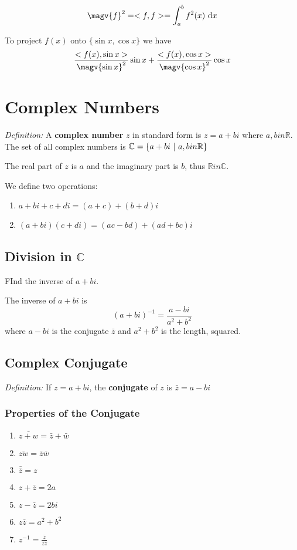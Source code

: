 \documentclass[12pt]{article}
\begin{document}
\[ \magv{f}^2 = <f,f> = \int_a^b f^2(x) \dd x \]

To project $f(x)$ onto $\{\sin x,\cos x\}$ we have \[ \frac{<f(x),\sin x>}{\magv{\sin x}^2}\sin x + \frac{<f(x),\cos x>}{\magv{\cos x}^2}\cos x \]

\section*{Complex Numbers}

\textit{Definition:} A {\bf complex number} $z$ in standard form is $z = a + bi$ where $a, b in \mathbb{R}$. The set of all complex numbers is $\mathbb{C} = \{a + bi \ |\  a, b in \mathbb{R}\}$

The real part of $z$ is $a$ and the imaginary part is $b$, thus $\mathbb{R} in \mathbb{C}$.

We define two operations:
\begin{enumerate}
\item $a + bi + c + di = (a + c) + (b + d)i$
\item $(a + bi)(c + di) = (ac - bd) + (ad + bc)i$
\end{enumerate}

\subsection*{Division in $\mathbb{C}$}
FInd the inverse of $a + bi$.

The inverse of $a + bi$ is \[ (a + bi)^{-1} = \frac{a - bi}{a^2 + b^2} \] where $a-bi$ is the conjugate $\bar{z}$ and $a^2 + b^2$ is the length, squared.

\subsection*{Complex Conjugate}
\textit{Definition:} If $z = a + bi$, the {\bf conjugate} of $z$ is $\bar{z} = a - bi$

\subsubsection*{Properties of the Conjugate}
\begin{enumerate}
\item $\bar{z+w} = \bar{z} + \bar{w}$
\item $\bar{zw} = \bar{z}\bar{w}$
\item $\bar{\bar{z}} = z$
\item $z + \bar{z} = 2a$
\item $z - \bar{z} = 2bi$
\item $z\bar{z} = a^2 + b^2$
\item $z^{-1} = \frac{\bar{z}}{z\bar{z}}$
\end{enumerate}
\end{document}
